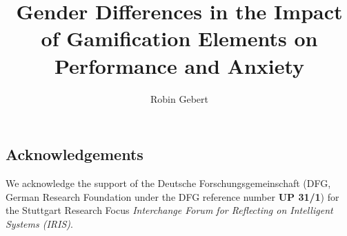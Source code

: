 \documentclass[stu, floatsintext, helv]{apa7}
\title{Gender Differences in the Impact of Gamification Elements on Performance and Anxiety}
\author{Robin Gebert}
\begin{document}
\maketitle


%






\subsection*{Acknowledgements}
We acknowledge the support of the Deutsche Forschungsgemeinschaft (DFG, German Research Foundation under the DFG reference number \textbf{UP 31/1}) for the Stuttgart Research Focus \textit{Interchange Forum for Reflecting on Intelligent Systems (IRIS)}.

\printbibliography
\end{document}
